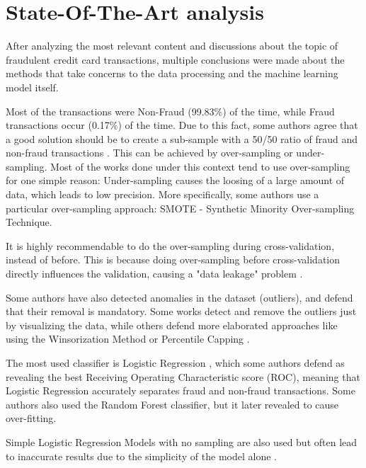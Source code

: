 \documentclass[conference]{IEEEtran}
\begin{document}
\section{State-Of-The-Art analysis}

After analyzing the most relevant content and discussions about the topic of fraudulent credit card transactions, multiple conclusions were made about the methods that take concerns to the data processing and the machine learning model itself. 

Most of the transactions were Non-Fraud (99.83\%) of the time, while Fraud transactions occur (0.17\%) of the time. Due to this fact, some authors agree that a good solution should be to create a sub-sample with a 50/50 ratio of fraud and non-fraud transactions \cite{paper_sqewed_data_calssifier}\cite{paper_dealing_with_imbalanced}. This can be achieved by over-sampling or under-sampling. Most of the works done under this context tend to use over-sampling \cite{paper_sqewed_data_calssifier}\cite{paper_dealing_with_imbalanced} for one simple reason: Under-sampling causes the loosing of a large amount of data, which leads to low precision. More specifically, some authors use a particular over-sampling approach: SMOTE - Synthetic Minority Over-sampling Technique.

It is highly recommendable to do the over-sampling during cross-validation, instead of before. This is because doing over-sampling before cross-validation directly influences the validation, causing a "data leakage" problem \cite{paper_dealing_with_imbalanced}.

Some authors have also detected anomalies in the dataset (outliers), and defend that their removal is mandatory. Some works detect and remove the outliers just by visualizing the data, while others defend more elaborated approaches like using the Winsorization Method or Percentile Capping \cite{paper_outlier_silent_killer}.

The most used classifier is Logistic Regression \cite{paper_sqewed_data_calssifier}\cite{paper_imbalanced_detail}\cite{paper_dealing_with_imbalanced}, which some authors defend as revealing the best Receiving Operating Characteristic score (ROC), meaning that Logistic Regression accurately separates fraud and non-fraud transactions. Some authors also used the Random Forest classifier, but it later revealed to cause over-fitting.

Simple Logistic Regression Models with no sampling are also used but often lead to inaccurate results due to the simplicity of the model alone \cite{paper_simple_logistic}.
\end{document}
